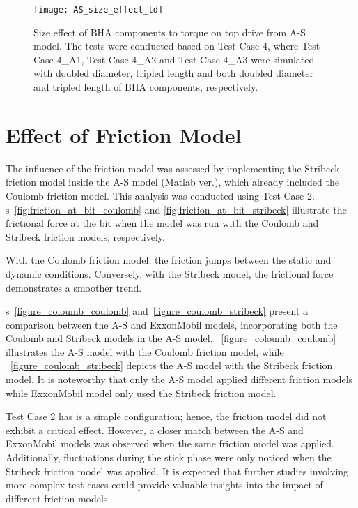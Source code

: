 \begin{figure}
	\centering
	\texttt{[image: AS\_size\_effect\_td]}
    \caption[Size effect of BHA components to a torque from A-S model]{Size effect of BHA components to torque on top drive from A-S model. The tests were conducted based on Test Case 4, where Test Case 4\_A1, Test Case 4\_A2 and Test Case 4\_A3 were simulated with doubled diameter, tripled length and both doubled diameter and tripled length of BHA components, respectively.}
	\label{figure_AS_BHA_size_effect_td}
\end{figure}


\section{Effect of Friction Model}
The influence of the friction model was assessed by implementing the Stribeck friction model inside the A-S model (Matlab ver.), which already included the Coulomb friction model. This analysis was conducted using Test Case 2. \figurename{}s~\ref{fig:friction_at_bit_coulomb} and \ref{fig:friction_at_bit_stribeck} illustrate the frictional force at the bit when the model was run with the Coulomb and Stribeck friction models, respectively.

With the Coulomb friction model, the friction jumps between the static and dynamic conditions.  Conversely, with the Stribeck model, the frictional force demonstrates a smoother trend.

\figurename{}s~\ref{figure_coloumb_coulomb} and~\ref{figure_coulomb_stribeck} present a comparison between the A-S and ExxonMobil models, incorporating both the Coulomb and Stribeck models in the A-S model. \figurename{}~\ref{figure_coloumb_coulomb} illustrates the A-S model with the Coulomb friction model, while \figurename{}~\ref{figure_coulomb_stribeck} depicts the A-S model with the Stribeck friction model. It is noteworthy that only the A-S model applied different friction models while ExxonMobil model only used the Stribeck friction model.

Test Case 2 has is a simple configuration; hence, the friction model did not exhibit a critical effect. However, a closer match between the A-S and ExxonMobil models was observed when the same friction model was applied. Additionally, fluctuations during the stick phase were only noticed when the Stribeck friction model was applied. It is expected that further studies involving more complex test cases could provide valuable insights into the impact of different friction models.

